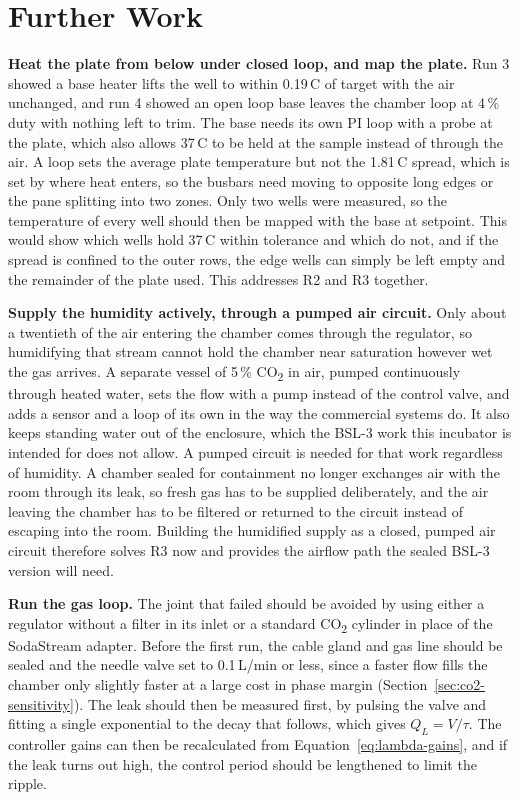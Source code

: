 \chapter{Further Work}
\label{ch:furtherwork}

\textbf{Heat the plate from below under closed loop, and map the plate.} Run 3 showed a base heater lifts the well to within 0.19\,\textdegree{}C of target with the air unchanged, and run 4 showed an open loop base leaves the chamber loop at 4\,\% duty with nothing left to trim. The base needs its own PI loop with a probe at the plate, which also allows 37\,\textdegree{}C to be held at the sample instead of through the air. A loop sets the average plate temperature but not the 1.81\,\textdegree{}C spread, which is set by where heat enters, so the busbars need moving to opposite long edges or the pane splitting into two zones. Only two wells were measured, so the temperature of every well should then be mapped with the base at setpoint. This would show which wells hold 37\,\textdegree{}C within tolerance and which do not, and if the spread is confined to the outer rows, the edge wells can simply be left empty and the remainder of the plate used. This addresses R2 and R3 together.

\textbf{Supply the humidity actively, through a pumped air circuit.} Only about a twentieth of the air entering the chamber comes through the regulator, so humidifying that stream cannot hold the chamber near saturation however wet the gas arrives. A separate vessel of 5\,\% CO\textsubscript{2} in air, pumped continuously through heated water, sets the flow with a pump instead of the control valve, and adds a sensor and a loop of its own in the way the commercial systems do. It also keeps standing water out of the enclosure, which the BSL-3 work this incubator is intended for does not allow. A pumped circuit is needed for that work regardless of humidity. A chamber sealed for containment no longer exchanges air with the room through its leak, so fresh gas has to be supplied deliberately, and the air leaving the chamber has to be filtered or returned to the circuit instead of escaping into the room. Building the humidified supply as a closed, pumped air circuit therefore solves R3 now and provides the airflow path the sealed BSL-3 version will need.

\textbf{Run the gas loop.} The joint that failed should be avoided by using either a regulator without a filter in its inlet or a standard CO\textsubscript{2} cylinder in place of the SodaStream adapter. Before the first run, the cable gland and gas line should be sealed and the needle valve set to 0.1\,L/min or less, since a faster flow fills the chamber only slightly faster at a large cost in phase margin (Section~\ref{sec:co2-sensitivity}). The leak should then be measured first, by pulsing the valve and fitting a single exponential to the decay that follows, which gives $Q_L = V/\tau$. The controller gains can then be recalculated from Equation~\ref{eq:lambda-gains}, and if the leak turns out high, the control period should be lengthened to limit the ripple.

